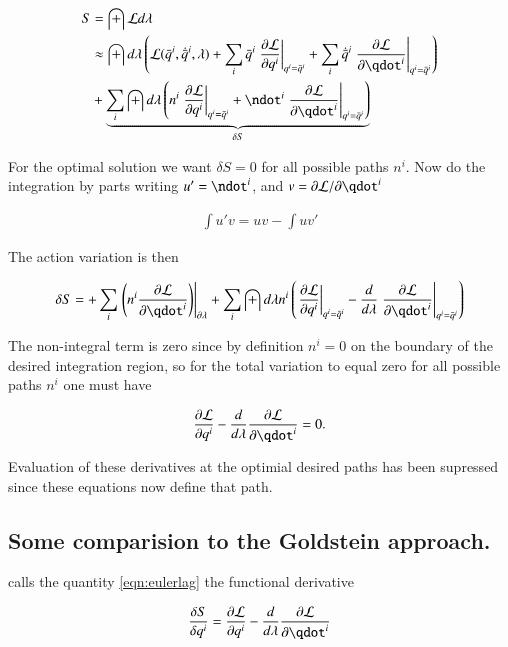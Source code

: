 \documentclass{article}
\newcommand{\qbar}[0]{\bar{q}}
\newcommand{\qdotbar}[0]{\dot{\bar{q}}}
\begin{document}
\begin{align*}
S &= \int \LL d\lambda \\
&\approx
\int d\lambda 
\left(
\LL(\qbar^i, \qdotbar^i, \lambda)
+ \sum_i \qbar^i \left. \PD{q^i}{\LL} \right\vert_{q^i = \qbar^i}
+ \sum_i \qdotbar^i \left. \PD{\qdot^i}{\LL} \right\vert_{q^i = \qbar^i}
\right) \\
&+
\underbrace{
\sum_i \int d\lambda
\left(
n^i \left. \PD{q^i}{\LL} \right\vert_{q^i = \qbar^i}
+\ndot^i \left. \PD{\qdot^i}{\LL} \right\vert_{q^i = \qbar^i}
\right)
}_{\delta S}
\end{align*}

For the optimal solution we want $\delta S = 0$ for all possible paths $n^i$.  Now do the integration by parts writing
$u' = \ndot^i$, and $v = \partial \LL/{\partial \qdot^i}$ 

\begin{align*}
\int u' v = u v - \int u v'
\end{align*}

The action variation is then

\begin{align*}
\delta S =
+ \sum_i \left. \left( n^i \PD{\qdot^i}{\LL} \right) \right\vert_{\partial \lambda}
+ \sum_i \int d\lambda n^i
\left(
\left. \PD{q^i}{\LL} \right\vert_{q^i = \qbar^i}
-\frac{d}{d\lambda} \left. \PD{\qdot^i}{\LL} \right\vert_{q^i = \qbar^i}
\right)
\end{align*}

The non-integral term is zero since by definition $n^i = 0$ on the boundary of the desired integration region, so for the
total variation to equal zero for all possible paths $n^i$ one must have

\begin{align}\label{eqn:eulerlag}
\PD{q^i}{\LL} -\frac{d}{d\lambda} \PD{\qdot^i}{\LL} = 0.
\end{align}

Evaluation of these derivatives at the optimial desired paths has been supressed since these equations now define that path.

\subsection{ Some comparision to the Goldstein approach. }

\cite{goldstein1951cm} calls the quantity \ref{eqn:eulerlag} the functional derivative

\begin{align*}
\frac{\delta S}{\delta q^i} = \PD{q^i}{\LL} -\frac{d}{d\lambda} \PD{\qdot^i}{\LL}
\end{align*}
\end{document}
